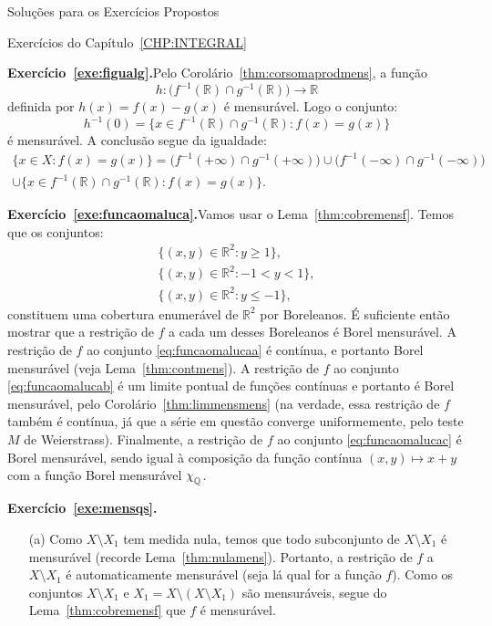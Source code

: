 \documentclass[oneside,final,11pt]{amsbook}
\newcommand{\R}{\mathds R}
\newcommand{\chilow}[1]{\chi_{\lower2pt\hbox{$\scriptstyle#1$}}}
\theoremstyle{remark}\newtheorem{exercise}{Exercício}[chapter]
\theoremstyle{remark}\newtheorem{*exercise}[exercise]{\hbox to 0pt{\hskip 0pt minus 1fil*}Exercício}
\theoremstyle{definition}\newtheorem{exdefin}{Definição}[chapter]
\theoremstyle{plain}\newtheorem{teo}{Teorema}[section]
\theoremstyle{plain}\newtheorem{lem}[teo]{Lema}
\theoremstyle{plain}\newtheorem{prop}[teo]{Proposição}
\theoremstyle{plain}\newtheorem{cor}[teo]{Corolário}
\theoremstyle{definition}\newtheorem{defin}[teo]{Definição}
\theoremstyle{remark}\newtheorem{rem}[teo]{Observação}
\theoremstyle{definition}\newtheorem{notation}[teo]{Notação}
\theoremstyle{definition}\newtheorem{convention}[teo]{Convenção}
\theoremstyle{definition}\newtheorem{example}[teo]{Exemplo}
\numberwithin{section}{chapter}
\numberwithin{equation}{section}
\begin{document}
\begin{chapter}{Soluções para os Exercícios Propostos}
\begin{section}{Exercícios do Capítulo~\ref{CHP:INTEGRAL}}
\medskip

\textbf{Exercício~\ref{exe:figualg}.}\enspace Pelo Corolário~\ref{thm:corsomaprodmens}, a função
\[h:\big(f^{-1}(\R)\cap g^{-1}(\R)\big)\longrightarrow\R\]
definida por $h(x)=f(x)-g(x)$ é mensurável. Logo o conjunto:
\[h^{-1}(0)=\big\{x\in f^{-1}(\R)\cap g^{-1}(\R):f(x)=g(x)\big\}\]
é mensurável. A conclusão segue da igualdade:
\begin{multline*}
\big\{x\in X:f(x)=g(x)\big\}=\big(f^{-1}(+\infty)\cap g^{-1}(+\infty)\big)\cup
\big(f^{-1}(-\infty)\cap g^{-1}(-\infty)\big)\\
\cup\big\{x\in f^{-1}(\R)\cap g^{-1}(\R):f(x)=g(x)\big\}.
\end{multline*}

\medskip

\textbf{Exercício~\ref{exe:funcaomaluca}.}\enspace Vamos usar o Lema~\ref{thm:cobremensf}.
Temos que os conjuntos:
\begin{subequations}
\begin{gather}
\big\{(x,y)\in\R^2:y\ge1\big\}\label{eq:funcaomalucaa},\\
\big\{(x,y)\in\R^2:-1<y<1\big\}\label{eq:funcaomalucab},\\
\big\{(x,y)\in\R^2:y\le-1\big\}\label{eq:funcaomalucac},
\end{gather}
\end{subequations}
constituem uma cobertura enumerável de $\R^2$ por Boreleanos. É suficiente então mostrar
que a restrição de $f$ a cada um desses Boreleanos é Borel mensurável. A restrição de $f$
ao conjunto \eqref{eq:funcaomalucaa} é contínua, e portanto Borel mensurável (veja Lema~\ref{thm:contmens}).
A restrição de $f$ ao conjunto \eqref{eq:funcaomalucab} é um limite pontual de funções contínuas
e portanto é Borel mensurável, pelo Corolário~\ref{thm:limmensmens} (na verdade, essa restrição de $f$
também é contínua, já que a série em questão converge uniformemente, pelo teste $M$ de Weierstrass).
Finalmente, a restrição de $f$ ao conjunto \eqref{eq:funcaomalucac} é Borel mensurável, sendo
igual à composição da função contínua $(x,y)\mapsto x+y$ com a função Borel mensurável
$\chilow{\mathbb Q}$.

\medskip

\textbf{Exercício~\ref{exe:mensqs}.}
\begin{itemize}
\item[(a)] Como $X\setminus X_1$ tem medida nula, temos que todo subconjunto de $X\setminus X_1$
é mensurável (recorde Lema~\ref{thm:nulamens}). Portanto, a restrição de $f$ a $X\setminus X_1$
é automaticamente mensurável (seja lá qual for a função $f$). Como os conjuntos $X\setminus X_1$ e
$X_1=X\setminus(X\setminus X_1)$ são mensuráveis, segue do Lema~\ref{thm:cobremensf} que
$f$ é mensurável.


\end{itemize}
\end{section}
\end{chapter}
\end{document}
